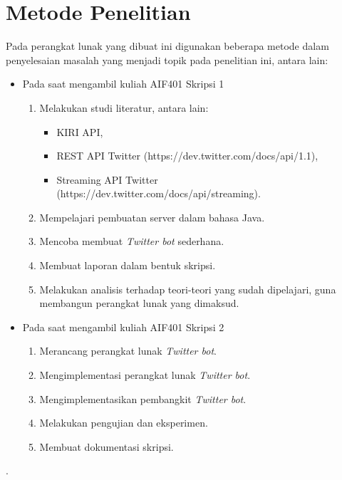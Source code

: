 \section{Metode Penelitian}
Pada perangkat lunak yang dibuat ini digunakan beberapa metode dalam penyelesaian masalah yang menjadi topik pada penelitian ini, antara lain:
\begin{itemize}
	\item Pada saat mengambil kuliah AIF401 Skripsi 1
	\begin{enumerate}
		\item Melakukan studi literatur, antara lain:
		\begin{itemize}
			\item KIRI API,
			\item REST API Twitter (https://dev.twitter.com/docs/api/1.1),
			\item Streaming API Twitter (https://dev.twitter.com/docs/api/streaming).
		\end{itemize}
		\item Mempelajari pembuatan server dalam bahasa Java.
		\item Mencoba membuat \textit{Twitter bot} sederhana.
		\item Membuat laporan dalam bentuk skripsi.
		\item Melakukan analisis terhadap teori-teori yang sudah dipelajari, guna membangun perangkat lunak yang dimaksud.
	\end{enumerate}
	\item Pada saat mengambil kuliah AIF401 Skripsi 2
	\begin{enumerate}
		\item Merancang perangkat lunak \textit{Twitter bot}.
		\item Mengimplementasi perangkat lunak \textit{Twitter bot}.
		\item Mengimplementasikan pembangkit \textit{Twitter bot}. 
		\item Melakukan pengujian dan eksperimen.
		\item Membuat dokumentasi skripsi.
	\end{enumerate}
\end{itemize}.
